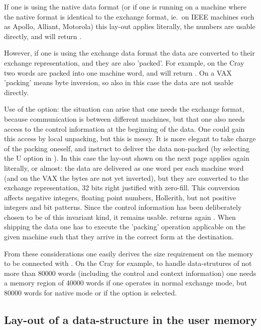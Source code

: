 If one is using the native data format
(or if one is running on a machine where the native format
is identical to the exchange format, ie.~on IEEE machines
such as Apollo, Alliant, Motorola)
this lay-out applies literally,
the numbers are usable directly,
and  will return .

However, if one is using the exchange data format
the data are converted to their exchange representation,
and they are also 'packed'.
For example, on the Cray two words are packed into one
machine word,
and  will return .
On a VAX 'packing' means byte inversion,
so also in this case the data are not usable directly.

Use of the  option:
the situation can arise that one needs the exchange format,
because communication is between different machines,
but that one also needs access to the control information
at the beginning of the data.
One could gain this access by local unpacking, but this is messy.
It is more elegant to take charge of the packing oneself,
and instruct  to deliver the data non-packed
(by selecting the U option in ).
In this case the lay-out shown on the next page
applies again literally, or almost:
the data are delivered as one word per each machine word
(and on the VAX the bytes are not yet inverted),
but they are converted to the exchange representation,
32 bits right justified with zero-fill.
This conversion affects negative integers, floating point numbers,
Hollerith, but not positive integers and bit patterns.
Since the control information has been deliberately chosen
to be of this invariant kind, it remains usable.
 returns again .
When shipping the data one has to execute the 'packing' operation
applicable on the given machine such that they arrive in
the correct form at the destination.

From these considerations one easily derives the size
requirement on the memory to be connected with .
On the Cray for example, to handle data-strutures of not more
than 80000 words (including the control and context information)
one needs a memory region of 40000 words if one operates
in normal exchange mode,
but 80000 words for native mode or if the  option is selected.

\subsection*{Lay-out of a data-structure in the user memory}

